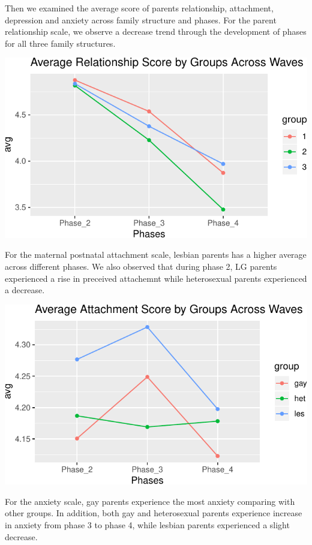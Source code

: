 \documentclass[man]{apa6}
\begin{document}
Then we examined the average score of parents relationship, attachment, depression and anxiety across family structure and phases. For the parent relationship scale, we observe a decrease trend through the development of phases for all three family structures.

\includegraphics{measures_descriptive_stats_files/figure-latex/fig1-1.pdf}

For the maternal postnatal attachment scale, lesbian parents has a higher average across different phases. We also observed that during phase 2, LG parents experienced a rise in preceived attachemnt while heterosexual parents experienced a decrease.

\includegraphics{measures_descriptive_stats_files/figure-latex/fig2-1.pdf}

For the anxiety scale, gay parents experience the most anxiety comparing with other groups. In addition, both gay and heterosexual parents experience increase in anxiety from phase 3 to phase 4, while lesbian parents experienced a slight decrease.
\end{document}
